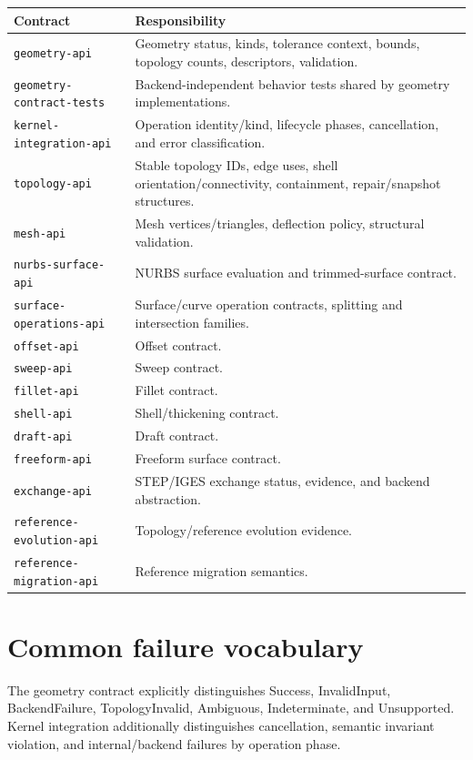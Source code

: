 \documentclass[11pt,a4paper]{report}
\begin{document}
\begin{longtable}{@{}p{}p{}@{}}
\toprule
Contract & Responsibility \\
\midrule
\texttt{geometry-api} & Geometry status, kinds, tolerance context, bounds, topology counts, descriptors, validation. \\
\texttt{geometry-contract-tests} & Backend-independent behavior tests shared by geometry implementations. \\
\texttt{kernel-integration-api} & Operation identity/kind, lifecycle phases, cancellation, and error classification. \\
\texttt{topology-api} & Stable topology IDs, edge uses, shell orientation/connectivity, containment, repair/snapshot structures. \\
\texttt{mesh-api} & Mesh vertices/triangles, deflection policy, structural validation. \\
\texttt{nurbs-surface-api} & NURBS surface evaluation and trimmed-surface contract. \\
\texttt{surface-operations-api} & Surface/curve operation contracts, splitting and intersection families. \\
\texttt{offset-api} & Offset contract. \\
\texttt{sweep-api} & Sweep contract. \\
\texttt{fillet-api} & Fillet contract. \\
\texttt{shell-api} & Shell/thickening contract. \\
\texttt{draft-api} & Draft contract. \\
\texttt{freeform-api} & Freeform surface contract. \\
\texttt{exchange-api} & STEP/IGES exchange status, evidence, and backend abstraction. \\
\texttt{reference-evolution-api} & Topology/reference evolution evidence. \\
\texttt{reference-migration-api} & Reference migration semantics. \\
\bottomrule
\end{longtable}

\section{Common failure vocabulary}
The geometry contract explicitly distinguishes Success, InvalidInput, BackendFailure, TopologyInvalid, Ambiguous, Indeterminate, and Unsupported. Kernel integration additionally distinguishes cancellation, semantic invariant violation, and internal/backend failures by operation phase.
\end{document}

